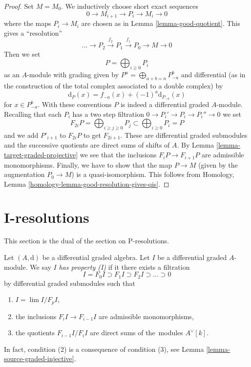 \begin{proof}
Set $M = M_0$. We inductively choose short exact sequences
$$
0 \to M_{i + 1} \to P_i \to M_i \to 0
$$
where the maps $P_i \to M_i$ are chosen as in Lemma \ref{lemma-good-quotient}.
This gives a ``resolution''
$$
\ldots \to P_2 \xrightarrow{f_2} P_1 \xrightarrow{f_1} P_0 \to M \to 0
$$
Then we set
$$
P = \bigoplus\nolimits_{i \geq 0} P_i
$$
as an $A$-module with grading given by
$P^n = \bigoplus_{a + b = n} P_{-a}^b$ and
differential (as in the construction of the total complex associated
to a double complex) by
$$
\text{d}_P(x) = f_{-a}(x) + (-1)^a \text{d}_{P_{-a}}(x)
$$
for $x \in P_{-a}^b$. With these conventions $P$ is indeed a differential
graded $A$-module. Recalling that each $P_i$ has a two step filtration
$0 \to P_i' \to P_i \to P_i'' \to 0$ we set
$$
F_{2i}P = \bigoplus\nolimits_{i \geq j \geq 0} P_j
\subset
\bigoplus\nolimits_{i \geq 0} P_i = P
$$
and we add $P'_{i + 1}$ to $F_{2i}P$ to get $F_{2i + 1}$.
These are differential graded submodules and the successive quotients
are direct sums of shifts of $A$. By
Lemma \ref{lemma-target-graded-projective} we see that
the inclusions $F_iP \to F_{i + 1}P$ are admissible monomorphisms.
Finally, we have to show that the map $P \to M$ (given by the
augmentation $P_0 \to M$) is a quasi-isomorphism. This follows from
Homology, Lemma \ref{homology-lemma-good-resolution-gives-qis}.
\end{proof}





\section{I-resolutions}
\label{section-I-resolutions}

\noindent
This section is the dual of the section on P-resolutions.

\medskip\noindent
Let $(A, \text{d})$ be a differential graded algebra.
Let $I$ be a differential graded $A$-module. We say $I$
{\it has property (I)} if it there exists a filtration
$$
I = F_0I \supset F_1I \supset F_2I \supset \ldots \supset 0
$$
by differential graded submodules such that
\begin{enumerate}
\item $I = \lim I/F_pI$,
\item the inclusions $F_iI \to F_{i - 1}I$ are admissible
monomorphisms,
\item the quotients $F_{i - 1}I/F_iI$ are direct sums of the\
modules $A^\vee[k]$.
\end{enumerate}
In fact, condition (2) is a consequence of condition (3), see
Lemma \ref{lemma-source-graded-injective}.

